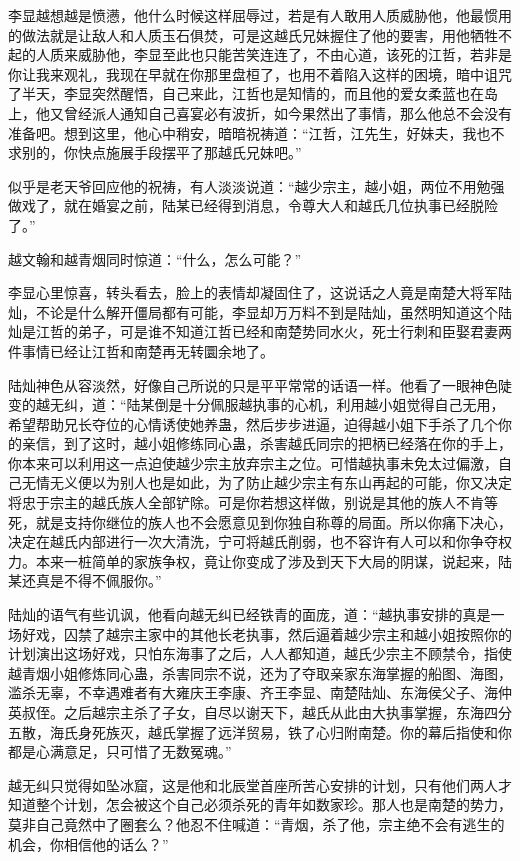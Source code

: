 李显越想越是愤懑，他什么时候这样屈辱过，若是有人敢用人质威胁他，他最惯用的做法就是让敌人和人质玉石俱焚，可是这越氏兄妹握住了他的要害，用他牺牲不起的人质来威胁他，李显至此也只能苦笑连连了，不由心道，该死的江哲，若非是你让我来观礼，我现在早就在你那里盘桓了，也用不着陷入这样的困境，暗中诅咒了半天，李显突然醒悟，自己来此，江哲也是知情的，而且他的爱女柔蓝也在岛上，他又曾经派人通知自己喜宴必有波折，如今果然出了事情，那么他总不会没有准备吧。想到这里，他心中稍安，暗暗祝祷道：“江哲，江先生，好妹夫，我也不求别的，你快点施展手段摆平了那越氏兄妹吧。”

似乎是老天爷回应他的祝祷，有人淡淡说道：“越少宗主，越小姐，两位不用勉强做戏了，就在婚宴之前，陆某已经得到消息，令尊大人和越氏几位执事已经脱险了。”

越文翰和越青烟同时惊道：“什么，怎么可能？”

李显心里惊喜，转头看去，脸上的表情却凝固住了，这说话之人竟是南楚大将军陆灿，不论是什么解开僵局都有可能，李显却万万料不到是陆灿，虽然明知道这个陆灿是江哲的弟子，可是谁不知道江哲已经和南楚势同水火，死士行刺和臣娶君妻两件事情已经让江哲和南楚再无转圜余地了。

陆灿神色从容淡然，好像自己所说的只是平平常常的话语一样。他看了一眼神色陡变的越无纠，道：“陆某倒是十分佩服越执事的心机，利用越小姐觉得自己无用，希望帮助兄长夺位的心情诱使她养蛊，然后步步进逼，迫得越小姐下手杀了几个你的亲信，到了这时，越小姐修练同心蛊，杀害越氏同宗的把柄已经落在你的手上，你本来可以利用这一点迫使越少宗主放弃宗主之位。可惜越执事未免太过偏激，自己无情无义便以为别人也是如此，为了防止越少宗主有东山再起的可能，你又决定将忠于宗主的越氏族人全部铲除。可是你若想这样做，别说是其他的族人不肯等死，就是支持你继位的族人也不会愿意见到你独自称尊的局面。所以你痛下决心，决定在越氏内部进行一次大清洗，宁可将越氏削弱，也不容许有人可以和你争夺权力。本来一桩简单的家族争权，竟让你变成了涉及到天下大局的阴谋，说起来，陆某还真是不得不佩服你。”

陆灿的语气有些讥讽，他看向越无纠已经铁青的面庞，道：“越执事安排的真是一场好戏，囚禁了越宗主家中的其他长老执事，然后逼着越少宗主和越小姐按照你的计划演出这场好戏，只怕东海事了之后，人人都知道，越氏少宗主不顾禁令，指使越青烟小姐修炼同心蛊，杀害同宗不说，还为了夺取亲家东海掌握的船图、海图，滥杀无辜，不幸遇难者有大雍庆王李康、齐王李显、南楚陆灿、东海侯父子、海仲英叔侄。之后越宗主杀了子女，自尽以谢天下，越氏从此由大执事掌握，东海四分五散，海氏身死族灭，越氏掌握了远洋贸易，铁了心归附南楚。你的幕后指使和你都是心满意足，只可惜了无数冤魂。”

越无纠只觉得如坠冰窟，这是他和北辰堂首座所苦心安排的计划，只有他们两人才知道整个计划，怎会被这个自己必须杀死的青年如数家珍。那人也是南楚的势力，莫非自己竟然中了圈套么？他忍不住喊道：“青烟，杀了他，宗主绝不会有逃生的机会，你相信他的话么？”


